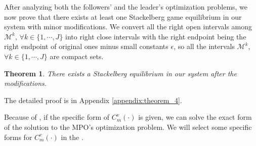 \documentclass[10pt,journal, compsoc]{IEEEtran}
\newtheorem{theorem}{Theorem}
\begin{document}
After analyzing both the followers' and the leader's optimization problems, we now prove that there exists at least one Stackelberg game equilibrium in our system with minor modifications. We convert all the right open intervals among $\mathcal{M}^k$, $\forall k \in \{1, \cdots, J\}$ into right close intervals with the right endpoint being the right endpoint of original ones minus small constants $\epsilon$, so all the intervals $\mathcal{M}^k$, $\forall k \in \{1, \cdots, J\}$ are compact sets. 
\begin{theorem} \label{thm:stackelberg_game_equilibrium}
There exists a Stackelberg equilibrium in our system after the modifications.
\end{theorem}
The detailed proof is in Appendix \ref{appendix:theorem_4}.

Because of , if the specific form of $C_m^v(\cdot)$ is given, we can solve the exact form of the solution to the MPO's optimization problem. We will select some specific forms for $C_m^v(\cdot)$ in the .
\end{document}
